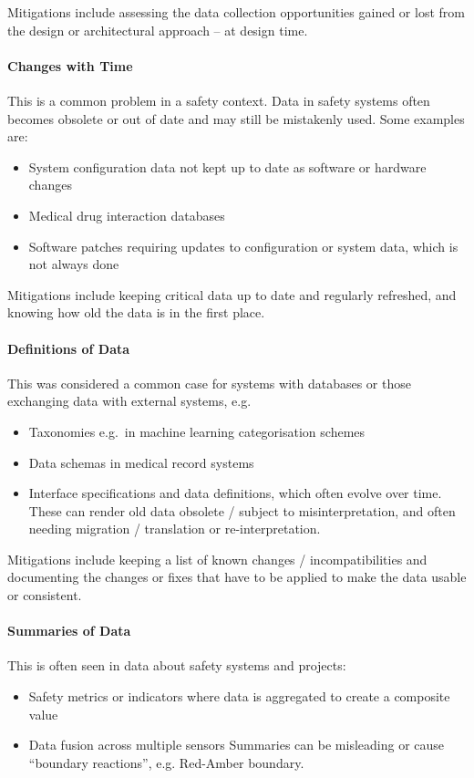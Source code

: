 Mitigations include assessing the data collection opportunities gained or lost from the design or architectural approach -- at design time.

\paragraph{Changes with Time}\label{bkm:dark7}
This is a common problem in a safety context. Data in safety systems often becomes obsolete or out of date and may still be mistakenly used. Some examples are:
\begin{itemize}
\item System \gls{configuration data} not kept up to date as software or hardware changes
  \item Medical drug interaction \glspl{database}
  \item Software patches requiring updates to configuration or system data, which is not always done
\end{itemize}

Mitigations include keeping \gls{critical data} up to date and regularly refreshed, and knowing how old the data is in the first place.

\paragraph{Definitions of Data}\label{bkm:dark8}
This was considered a common case for systems with \glspl{database} or those exchanging data with external systems, e.g.
\begin{itemize}
\item Taxonomies e.g.\ in machine learning categorisation schemes
  \item Data schemas in medical record systems 
  \item Interface specifications and data definitions, which often evolve over time. These can render old data obsolete / subject to misinterpretation, and often needing migration / translation or re-interpretation.
\end{itemize}

Mitigations include keeping a list of known changes / incompatibilities and documenting the changes or fixes that have to be applied to make the data usable or consistent.

\paragraph{Summaries of Data}\label{bkm:dark9}
This is often seen in data about safety systems and projects:
\begin{itemize}
\item Safety metrics or indicators where data is aggregated to create a composite value
  \item Data fusion across multiple sensors
Summaries can be misleading or cause “boundary reactions”, e.g. Red-Amber boundary.
\end{itemize}

